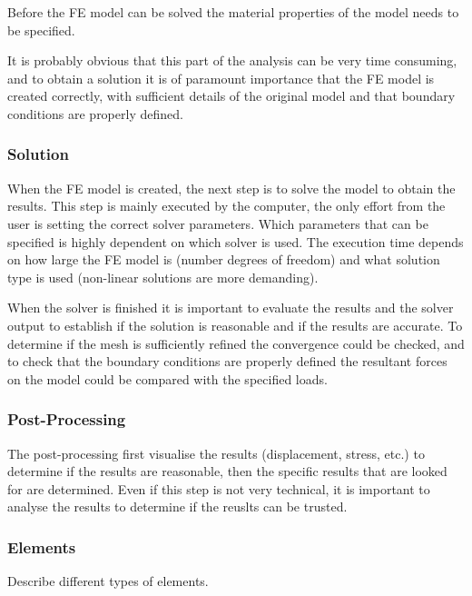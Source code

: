 Before the FE model can be solved the material properties of the model needs to be specified.

It is probably obvious that this part of the analysis can be very time consuming, and to obtain a solution it is of paramount importance that the FE model is created correctly, with sufficient details of the original model and that boundary conditions are properly defined.

\subsubsection{Solution} %
\label{ssub:solution}
When the FE model is created, the next step is to solve the model to obtain the results. This step is mainly executed by the computer, the only effort from the user is setting the correct solver parameters. Which parameters that can be specified is highly dependent on which solver is used. The execution time depends on how large the FE model is (number degrees of freedom) and what solution type is used (non-linear solutions are more demanding).

When the solver is finished it is important to evaluate the results and the solver output to establish if the solution is reasonable and if the results are accurate. To determine if the mesh is sufficiently refined the convergence could be checked, and to check that the boundary conditions are properly defined the resultant forces on the model could be compared with the specified loads.~\cite[p.~303-324]{adams99}

\subsubsection{Post-Processing} %
\label{ssub:post_processing}
The post-processing first visualise the results (displacement, stress, etc.) to determine if the results are reasonable, then the specific results that are looked for are determined. Even if this step is not very technical, it is important to analyse the results to determine if the reuslts can be trusted.

\subsubsection{Elements} %
\label{ssub:elements}
Describe different types of elements.

